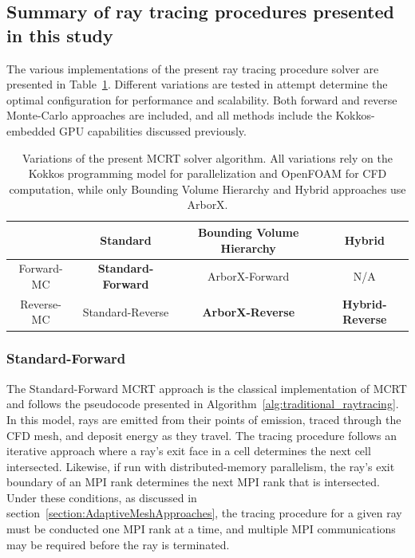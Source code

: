 
\subsection{Summary of ray tracing procedures presented in this study}\label{section:SummaryOfSolvers}

The various implementations of the present ray tracing procedure solver are presented in Table~\ref{table:SolverImplementations}. Different variations are tested in attempt determine the optimal configuration for performance and scalability. Both forward and reverse Monte-Carlo approaches are included, and all methods include the Kokkos-embedded GPU capabilities discussed previously.

\begin{table}
\centering
\caption{Variations of the present MCRT solver algorithm. All variations rely on the Kokkos programming model for parallelization and OpenFOAM for CFD computation, while only Bounding Volume Hierarchy and Hybrid approaches use ArborX.}
\begin{tabular}{c | c c c} 
 \hline
 ~ & Standard & Bounding Volume Hierarchy & Hybrid \\ [0.5ex] 
 \hline
 Forward-MC & \textbf{Standard-Forward} & ArborX-Forward & N/A  \\
 Reverse-MC & Standard-Reverse & \textbf{ArborX-Reverse} & \textbf{Hybrid-Reverse} \\
 \hline
\end{tabular}
\label{table:SolverImplementations}
\end{table}

\subsubsection{Standard-Forward}
The Standard-Forward MCRT approach is the classical implementation of MCRT and follows the pseudocode presented in Algorithm~\ref{alg:traditional_raytracing}. In this model, rays are emitted from their points of emission, traced through the CFD mesh, and deposit energy as they travel. The tracing procedure follows an iterative approach where a ray's exit face in a cell determines the next cell intersected. Likewise, if run with distributed-memory parallelism, the ray's exit boundary of an MPI rank determines the next MPI rank that is intersected. Under these conditions, as discussed in section~\ref{section:AdaptiveMeshApproaches}, the tracing procedure for a given ray must be conducted one MPI rank at a time, and multiple MPI communications may be required before the ray is terminated.

